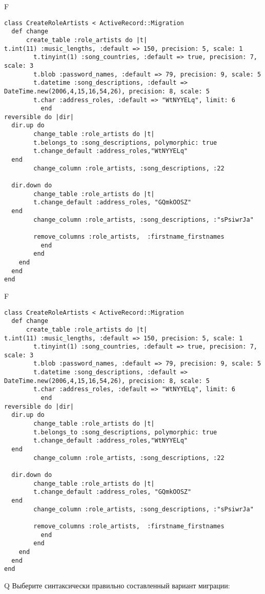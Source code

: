 F
\begin{verbatim}
class CreateRoleArtists < ActiveRecord::Migration
  def change
	  create_table :role_artists do |t|
t.int(11) :music_lengths, :default => 150, precision: 5, scale: 1
		t.tinyint(1) :song_countries, :default => true, precision: 7, scale: 3
		t.blob :password_names, :default => 79, precision: 9, scale: 5
		t.datetime :song_descriptions, :default => DateTime.new(2006,4,15,16,54,26), precision: 8, scale: 5
		t.char :address_roles, :default => "WtNYYELq", limit: 6
		  end
reversible do |dir|
  dir.up do
		change_table :role_artists do |t|
		t.belongs_to :song_descriptions, polymorphic: true
 		t.change_default :address_roles,"WtNYYELq"
  end
 		change_column :role_artists, :song_descriptions, :22
   
  dir.down do
		change_table :role_artists do |t|
		t.change_default :address_roles, "GQmkOOSZ"
  end
 		change_column :role_artists, :song_descriptions, :"sPsiwrJa"
   
		remove_columns :role_artists,  :firstname_firstnames 
	      end
	    end
    end 
  end
end

\end{verbatim}

F
\begin{verbatim}
class CreateRoleArtists < ActiveRecord::Migration
  def change
	  create_table :role_artists do |t|
t.int(11) :music_lengths, :default => 150, precision: 5, scale: 1
		t.tinyint(1) :song_countries, :default => true, precision: 7, scale: 3
		t.blob :password_names, :default => 79, precision: 9, scale: 5
		t.datetime :song_descriptions, :default => DateTime.new(2006,4,15,16,54,26), precision: 8, scale: 5
		t.char :address_roles, :default => "WtNYYELq", limit: 6
		  end
reversible do |dir|
  dir.up do
		change_table :role_artists do |t|
		t.belongs_to :song_descriptions, polymorphic: true
 		t.change_default :address_roles,"WtNYYELq"
  end
 		change_column :role_artists, :song_descriptions, :22
   
  dir.down do
		change_table :role_artists do |t|
		t.change_default :address_roles, "GQmkOOSZ"
  end
 		change_column :role_artists, :song_descriptions, :"sPsiwrJa"
   
		remove_columns :role_artists,  :firstname_firstnames 
	      end
	    end
    end 
  end
end

\end{verbatim}

Q
Выберите синтаксически правильно составленный вариант миграции:

